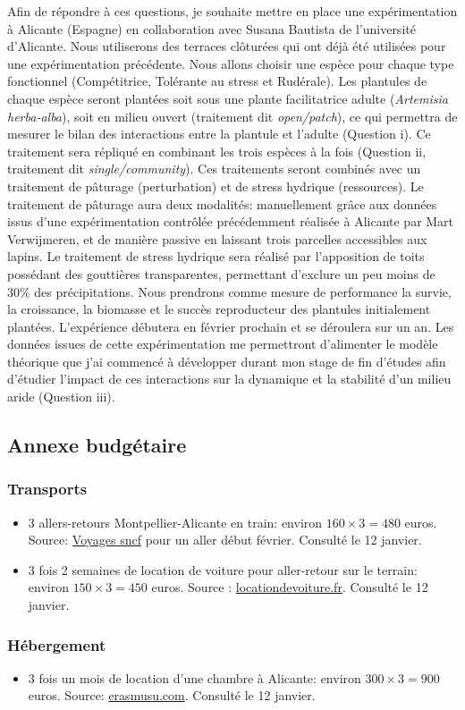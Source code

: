 \documentclass[12pt]{article} %
\begin{document}
Afin de répondre à ces questions, je souhaite mettre en place une expérimentation à Alicante (Espagne) en collaboration avec Susana Bautista de l'université d'Alicante. Nous utiliserons des terraces clôturées qui ont déjà été utilisées pour une expérimentation précédente. Nous allons choisir une espèce pour chaque type fonctionnel (Compétitrice, Tolérante au stress et Rudérale). Les plantules de chaque espèce seront plantées soit sous une plante facilitatrice adulte (\textit{Artemisia herba-alba}), soit en milieu ouvert (traitement dit \textit{open/patch}), ce qui permettra de mesurer le bilan des interactions entre la plantule et l'adulte (Question i). Ce traitement sera répliqué en combinant les trois espèces à la fois (Question ii, traitement dit \textit{single/community}). Ces traitements seront combinés avec un traitement de pâturage (perturbation) et de stress hydrique (ressources). Le traitement de pâturage aura deux modalités: manuellement grâce aux données issus d'une expérimentation contrôlée précédemment réalisée à Alicante par Mart Verwijmeren, et de manière passive en laissant trois parcelles accessibles aux lapins. Le traitement de stress hydrique sera réalisé par l'apposition de toits possédant des gouttières transparentes, permettant d'exclure un peu moins de 30\% des précipitations. Nous prendrons comme mesure de performance la survie, la croissance, la biomasse et le succès reproducteur des plantules initialement plantées. L'expérience débutera en février prochain et se déroulera sur un an.
Les données issues de cette expérimentation me permettront d'alimenter le modèle théorique que j'ai commencé à développer durant mon stage de fin d'études afin d'étudier l'impact de ces interactions sur la dynamique et la stabilité d'un milieu aride (Question iii).

\printbibliography

\subsection{Annexe budgétaire}

\subsubsection{Transports}

\begin{itemize}
\item 3 allers-retours Montpellier-Alicante en train: environ $160 \times 3 = 480$ euros. Source: \href{http://www.voyages-sncf.com}{Voyages sncf} pour un aller début février. Consulté le 12 janvier. 

\item 3 fois 2 semaines de location de voiture pour aller-retour sur le terrain: environ $150 \times 3 = 450$ euros. Source : \href{https://www.locationdevoiture.fr/}{locationdevoiture.fr}. Consulté le 12 janvier.
\end{itemize}

\subsubsection{Hébergement}

\begin{itemize}
\item 3 fois un mois de location d'une chambre à Alicante: environ $300 \times 3 = 900$ euros. Source:
\href{http://erasmusu.com/fr/erasmus-alicante/logement-etudiant}{erasmusu.com}. Consulté le 12 janvier.
\end{itemize}
\end{document}
